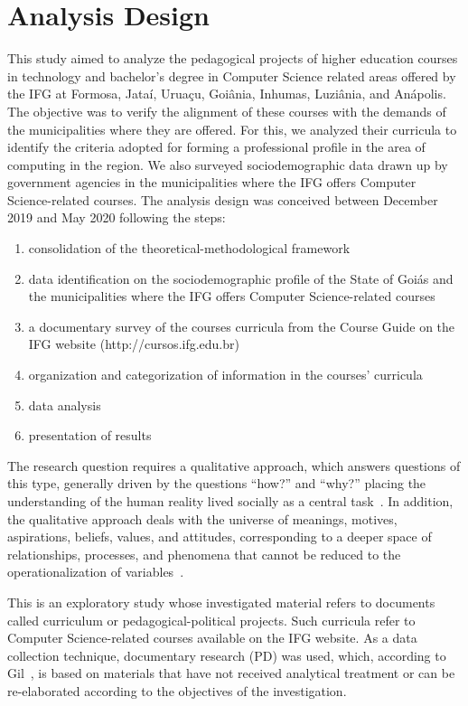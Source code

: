 \documentclass[sigconf, review]{educomp}
\begin{document}
\section{Analysis Design}\label{Protocol}
This study aimed to analyze the pedagogical projects of higher education courses in technology and bachelor's degree in Computer Science related areas offered by the IFG at Formosa, Jataí, Uruaçu, Goiânia, Inhumas, Luziânia, and Anápolis.
The objective was to verify the alignment of these courses with the demands of the municipalities where they are offered.
For this, we analyzed their curricula to identify the criteria adopted for forming a professional profile in the area of computing in the region.
We also surveyed sociodemographic data drawn up by government agencies in the municipalities where the IFG offers Computer Science-related courses.
The analysis design was conceived between December 2019 and May 2020 following the steps:
\begin{enumerate}
    \item consolidation of the theoretical-methodological framework
    \item data identification on the sociodemographic profile of the State of Goiás and the municipalities where the  IFG offers Computer Science-related courses
    \item a documentary survey of the courses curricula from the Course Guide on the IFG website (http://cursos.ifg.edu.br)
    \item organization and categorization of information in the courses' curricula
    \item data analysis
    \item presentation of results
\end{enumerate}

The research question requires a qualitative approach, which answers questions of this type, generally driven by the questions ``how?'' and ``why?'' placing the understanding of the human reality lived socially as a central task~\cite{minayo2000desafio}.
In addition, the qualitative approach deals with the universe of meanings, motives, aspirations, beliefs, values, and attitudes, corresponding to a deeper space of relationships, processes, and phenomena that cannot be reduced to the operationalization of variables~\cite{souza2003novas}.

This is an exploratory study whose investigated material refers to documents called curriculum or pedagogical-political projects.
Such curricula refer to Computer Science-related courses available on the IFG website.
As a data collection technique, documentary research (PD) was used, which, according to Gil~\citep{gil2008metodos}, is based on materials that have not received analytical treatment or can be re-elaborated according to the objectives of the investigation.
\end{document}

